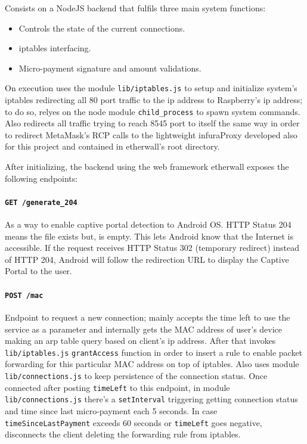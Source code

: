 \documentclass[12pt]{amsart}
\begin{document}
\begin{multicols}{2}
\vspace{0.35cm}

Consists on a NodeJS backend that fulfils three main system functions:

\begin{itemize}
\item Controls the state of the current connections.
\item iptables interfacing.
\item Micro-payment signature and amount validations.
\end{itemize}

On execution uses the module \texttt{lib/iptables.js}
to setup and initialize system's iptables redirecting
all 80 port traffic to the ip address to Raspberry's
ip address; to do so, relyes on the node module \texttt{child\_process}
to spawn system commands. Also redirects all traffic trying
to reach 8545 port to itself the same way in order to
redirect MetaMask's RCP calls to the lightweight infuraProxy\cite{infuraProxy}
developed also for this project and contained in etherwall's root directory.

\vspace{0.35cm}

After initializing, the backend using the web framework\cite{express}
etherwall exposes the following endpoints:

\vspace{0.35cm}

\paragraph{\texttt{GET /generate\_204}} As a way to enable
captive portal detection to Android OS. HTTP Status 204
means the file exists but, is empty.
This lets Android know that the Internet is accessible.
If the request receives HTTP Status 302 (temporary redirect)
instead of HTTP 204, Android will follow the
redirection URL to display the Captive Portal to the user.

\vspace{0.35cm}

\paragraph{\texttt{POST /mac}} Endpoint to request a new
connection; mainly
accepts the time left to use the service as a parameter
and internally gets the MAC address of user's device
making an arp table query based on client's ip address.
After that invokes \texttt{lib/iptables.js} \texttt{grantAccess}
function in order to insert a rule to enable packet forwarding
for this particular MAC address on top of iptables.
Also uses module \texttt{lib/connections.js} to keep persistence
of the connection status. Once connected after posting
\texttt{timeLeft} to this endpoint, in module
\texttt{lib/connections.js} there's a \texttt{setInterval}
triggering getting connection status and time since last
micro-payment each 5 seconds. In case \texttt{timeSinceLastPayment}
exceeds 60 seconds or \texttt{timeLeft} goes negative,
disconnects the client deleting the forwarding rule from
iptables.


\end{multicols}
\end{document}
